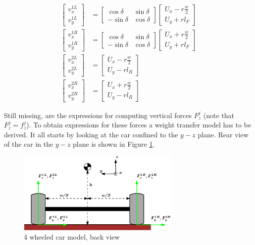 \documentclass[paper=a4, fontsize=11pt]{scrartcl} %
\numberwithin{equation}{section} %
\numberwithin{figure}{section} %
\numberwithin{table}{section} %
\begin{document}
\begin{align}
\begin{bmatrix}
v^{1L}_x \\
v^{1L}_y
\end{bmatrix} & = \begin{bmatrix}
\cos\delta & \sin\delta \\
-\sin\delta & \cos\delta
\end{bmatrix} \begin{bmatrix}
U_x - r\frac{w}{2} \\
U_y + r l_F
\end{bmatrix} \\
\begin{bmatrix}
v^{1R}_x \\
v^{1R}_y
\end{bmatrix} & = \begin{bmatrix}
\cos\delta & \sin\delta \\
-\sin\delta & \cos\delta
\end{bmatrix} \begin{bmatrix}
U_x + r\frac{w}{2} \\
U_y + r l_F
\end{bmatrix} \\
\begin{bmatrix}
v^{2L}_x \\
v^{2L}_y
\end{bmatrix} & = \begin{bmatrix}
U_x - r\frac{w}{2} \\
U_y - r l_R
\end{bmatrix}\\
\begin{bmatrix}
v^{2R}_x \\
v^{2R}_y
\end{bmatrix} & = \begin{bmatrix}
U_x + r\frac{w}{2} \\
U_y - r l_R
\end{bmatrix}
\end{align}

Still missing, are the expressions for computing vertical forces $F^j_z$ (note that $F^j_z = f^j_z$). To obtain expressions for these forces a weight transfer model has to be derived. It all starts by looking at the car confined to the $y-z$ plane. Rear view of the car in the $y-z$ plane is shown in Figure \ref{4wheelYZplane}.

\begin{figure}[h!]
	\centering
	\includegraphics[width=0.7\textwidth]{drawings/4wheelYZplane.png}
	\caption{4 wheeled car model, back view}
	\label{4wheelYZplane}
\end{figure}
\end{document}
